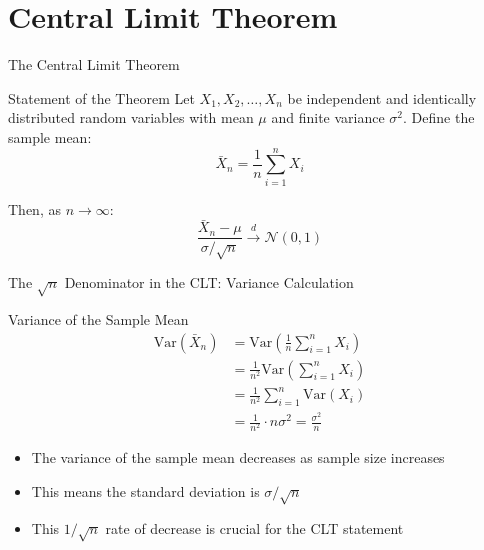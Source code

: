 \documentclass{beamer}
\begin{document}
\section{Central Limit Theorem}

\begin{frame}{The Central Limit Theorem}
  \begin{block}{Statement of the Theorem}
    Let $X_1, X_2, \ldots, X_n$ be independent and identically distributed random variables with mean $\mu$ and finite variance $\sigma^2$. Define the sample mean:
    \[
    \bar{X}_n = \frac{1}{n} \sum_{i=1}^{n} X_i
    \]
    
    Then, as $n \to \infty$:
    \[
    \frac{\bar{X}_n - \mu}{\sigma/\sqrt{n}} \stackrel{d}{\to} \mathcal{N}(0, 1)
    \]
  \end{block}
\end{frame}

\begin{frame}{The $\sqrt{n}$ Denominator in the CLT: Variance Calculation}
  \begin{block}{Variance of the Sample Mean}
    \begin{align*}
    \text{Var}(\bar{X}_n) &= \text{Var}\left(\frac{1}{n}\sum_{i=1}^{n}X_i\right) \\
    &= \frac{1}{n^2}\text{Var}\left(\sum_{i=1}^{n}X_i\right) \\
    &= \frac{1}{n^2}\sum_{i=1}^{n}\text{Var}(X_i) \\
    &= \frac{1}{n^2} \cdot n\sigma^2 = \frac{\sigma^2}{n}
    \end{align*}
  \end{block}
  
  \begin{itemize}
    \item The variance of the sample mean decreases as sample size increases
    \item This means the standard deviation is $\sigma/\sqrt{n}$
    \item This $1/\sqrt{n}$ rate of decrease is crucial for the CLT statement
  \end{itemize}
\end{frame}
\end{document}
